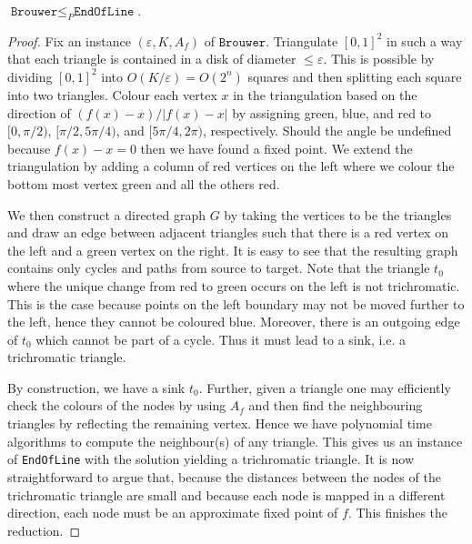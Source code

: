 \documentclass{article}
\begin{document}
\begin{theorem} 
  $\texttt{Brouwer}\leq_P\texttt{EndOfLine}$.
  \begin{proof}
    Fix an instance $(\varepsilon,K,A_f)$ of $\texttt{Brouwer}$.
    Triangulate $[0,1]^2$ in such a way that each triangle is
    contained in a disk of diameter $\leq\varepsilon$. This is
    possible by dividing $[0,1]^2$ into $O(K/\varepsilon)=O(2^n)$ squares
    and then splitting each square into two triangles.
    Colour each
    vertex $x$ in the triangulation based on the direction of
    $(f(x)-x)/|f(x)-x|$ by assigning green, blue, and red to $[0,\pi/2)$, $[\pi/2,5\pi/4)$, and $[5\pi/4,2\pi)$, respectively.
    Should the angle be undefined because $f(x)-x=0$ then we have
    found a fixed point.
    We extend the triangulation by adding a column of red vertices on the
    left where we colour the bottom most vertex green and all the others
    red.

    We then construct a directed graph $G$ by taking the vertices to be the triangles
    and draw an edge between adjacent triangles such that there is
    a red vertex on the left and a green vertex on the right.
    It is
    easy to see that the resulting graph contains only cycles
    and paths from source to target. Note that the triangle $t_0$ where
    the unique change from red to green occurs on the left is not
    trichromatic. This is the case because points on the left
    boundary may not be moved further to the left, hence they cannot
    be coloured blue. Moreover, there is an outgoing edge of $t_0$
    which cannot be part of a cycle. Thus it must lead to
    a sink, i.e. a trichromatic triangle.

    By construction, we have a sink $t_0$. Further, given a triangle one
    may efficiently check the colours of the nodes by using $A_f$
    and then find the neighbouring triangles by reflecting the
    remaining vertex.
    Hence we have polynomial time algorithms to compute the neighbour(s)
    of any triangle. This gives us an instance of \texttt{EndOfLine} with the solution yielding
    a trichromatic triangle.
    It is now straightforward to argue
    that, because the distances between the nodes of the trichromatic
    triangle are small and because each node is mapped in a different
    direction, each node must be an approximate fixed point of $f$.
    This finishes the reduction.
  \end{proof}
\end{theorem}
\end{document}
